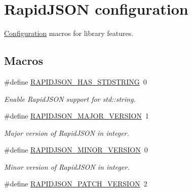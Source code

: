 \hypertarget{group__RAPIDJSON__CONFIG}{}\section{Rapid\+J\+S\+ON configuration}
\label{group__RAPIDJSON__CONFIG}


\hyperlink{classConfiguration}{Configuration} macros for library features.  


\subsection*{Macros}
\begin{DoxyCompactItemize}
\item 
\#define \hyperlink{group__RAPIDJSON__CONFIG_ga2f2eef0ee4477f3fe5874703a66e997f}{R\+A\+P\+I\+D\+J\+S\+O\+N\+\_\+\+H\+A\+S\+\_\+\+S\+T\+D\+S\+T\+R\+I\+NG}~0
\begin{DoxyCompactList}\small\item\em Enable Rapid\+J\+S\+ON support for {\ttfamily std\+::string}. \end{DoxyCompactList}\item 
\mbox{\label{group__RAPIDJSON__CONFIG_gaf1ff1685be6cbebb5d4b2ab997776f45}} 
\#define \hyperlink{group__RAPIDJSON__CONFIG_gaf1ff1685be6cbebb5d4b2ab997776f45}{R\+A\+P\+I\+D\+J\+S\+O\+N\+\_\+\+M\+A\+J\+O\+R\+\_\+\+V\+E\+R\+S\+I\+ON}~1
\begin{DoxyCompactList}\small\item\em Major version of Rapid\+J\+S\+ON in integer. \end{DoxyCompactList}\item 
\mbox{\label{group__RAPIDJSON__CONFIG_gaf9125105c593a636a79f1c2d96835376}} 
\#define \hyperlink{group__RAPIDJSON__CONFIG_gaf9125105c593a636a79f1c2d96835376}{R\+A\+P\+I\+D\+J\+S\+O\+N\+\_\+\+M\+I\+N\+O\+R\+\_\+\+V\+E\+R\+S\+I\+ON}~0
\begin{DoxyCompactList}\small\item\em Minor version of Rapid\+J\+S\+ON in integer. \end{DoxyCompactList}\item 
\mbox{\label{group__RAPIDJSON__CONFIG_gaf967d31be43666ce7f53756d73bd1cdf}} 
\#define \hyperlink{group__RAPIDJSON__CONFIG_gaf967d31be43666ce7f53756d73bd1cdf}{R\+A\+P\+I\+D\+J\+S\+O\+N\+\_\+\+P\+A\+T\+C\+H\+\_\+\+V\+E\+R\+S\+I\+ON}~2

\end{DoxyCompactItemize}
